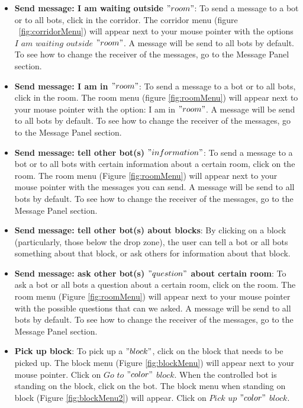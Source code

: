\begin{itemize}
\item \textbf{Send message: I am waiting outside $"room"$}:
To send a message to a bot or to all bots, click in the corridor. The corridor menu (figure ~\ref{fig:corridorMenu}) will appear next to your mouse pointer with the options $I$ $am$ $waiting$ $outside$ $"room"$. A message will be send to all bots by default. To see how to change the receiver of the messages, go to the Message Panel section.

\item \textbf{Send message: I am in $"room"$}:
To send a message to a bot or to all bots, click in the room. The room menu (figure \ref{fig:roomMenu}) will appear next to your mouse pointer with the option: I am in $"room"$. A message will be send to all bots by default. To see how to change the receiver of the messages, go to the Message Panel section.

\item \textbf{Send message: tell other bot(s) $"information"$}:
To send a message to a bot or to all bots with certain information about a certain room, click on the room. The room menu (Figure \ref{fig:roomMenu}) will appear next to your mouse pointer with the messages you can send. A message will be send to all bots by default. To see how to change the receiver of the messages, go to the Message Panel section.

\item \textbf{Send message: tell other bot(s) about blocks}:
By clicking on a block (particularly, those below the drop zone), the user can tell a bot or all bots something about that block, or ask others for information about that block.

\item \textbf{Send message: ask other bot(s) $"question"$ about certain room}:
To ask a bot or all bots a question about a certain room, click on the room. The room menu (Figure \ref{fig:roomMenu}) will appear next to your mouse pointer with the possible questions that can we asked. A message will be send to all bots by default. To see how to change the receiver of the messages, go to the Message Panel section.

\item \textbf{Pick up block}:
To pick up a $"block"$, click on the block that needs to be picked up. The block menu (Figure \ref{fig:blockMenu}) will appear next to your mouse pointer. Click on $Go$ $to$ $"color"$ $block$. When the controlled bot is standing on the block, click on the bot. The block menu when standing on block (Figure \ref{fig:blockMenu2}) will appear. Click on $Pick$ $up$ $"color"$ $block$.


\end{itemize}
